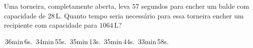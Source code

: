 Uma torneira, completamente aberta, leva $57$ segundos para encher um balde com capacidade de $28$\,L. Quanto tempo seria necessário para essa torneira encher um recipiente com capacidade para $1064$\,L?

\,36min\,6s.
\,34min\,55s.
\,35min\,13s.
\,35min\,44s.
\,33min\,58s.



